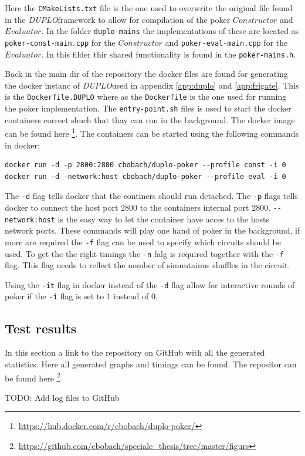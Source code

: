 \documentclass[twoside,11pt,openright]{report}
\newcommand{\todo}[1]{}
\renewcommand{\todo}[1]{{\color{red} TODO: {#1}} \\}
\newcommand{\DUPLO}{\textit{DUPLO}}
\begin{document}
\begin{appendices}
Here the \verb|CMakeLists.txt| file is the one used to overwrite the original file found in the \DUPLO framework to allow for compilation of the poker $Constructor$ and $Evaluator$. In the folder \verb|duplo-mains| the implementations of these are located as \verb|poker-const-main.cpp| for the $Constructor$ and \verb|poker-eval-main.cpp| for the $Evaluator$. In this filder thir shared functionality is found in the \verb|poker-mains.h|.

\bigskip

Back in the main dir of the repository the docker files are found for generating the docker instanc of \DUPLO used in appendix \ref{app:duplo} and \ref{app:frigate}. This is the \verb|Dockerfile.DUPLO| where as the \verb|Dockerfile| is the one used for running the poker implementation. The \verb|entry-point.sh| files is used to start the docker containers correct shuch that thay can run in the background. The docker image can be found here \footnote{\url{https://hub.docker.com/r/cbobach/duplo-poker/}}. The containers can be started using the following commands in docker:

\begin{center}
\begin{verbatim}
docker run -d -p 2800:2800 cbobach/duplo-poker --profile const -i 0
docker run -d -network:host cbobach/duplo-poker --profile eval -i 0
\end{verbatim}
\end{center}

The \verb|-d| flag tells docker that the continers should run detached. The \verb|-p| flags tells docker to connect the host port $2800$ to the containers internal port 2800. \verb|--network:host| is the easy way to let the container have acces to the hosts network ports. These commands will play one hand of poker in the background, if more are required the \verb|-f| flag can be used to specify which circuits should be used. To get the the right timings the \verb|-n| falg is required together with the \verb|-f| flag. This flag needs to reflect the nomber of simuntainus shuffles in the circuit.

Using the \verb|-it| flag in docker instead of the \verb|-d| flag allow for interactive rounds of poker if the \verb|-i| flag is set to $1$ instead of $0$.


\subsection{Test results}
\label{app:test-res}
In this section a link to the repository on GitHub with all the generated statistics. Here all generated graphs and timings can be found. The repositor can be found here \footnote{\url{https://github.com/cbobach/speciale_thesis/tree/master/figurs}}

\todo{Add log files to GitHub}



\end{appendices}
\end{document}
